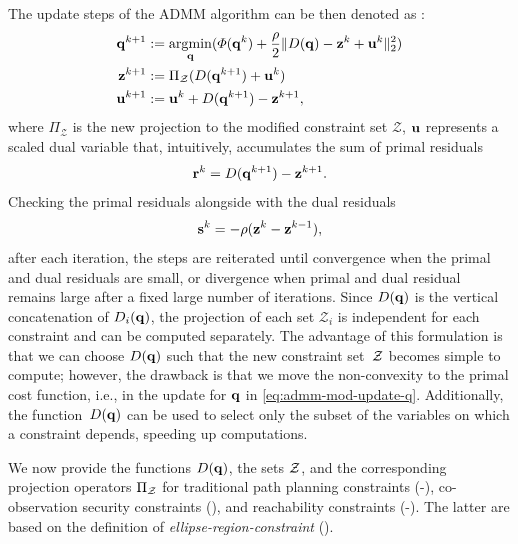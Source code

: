\documentclass[journal]{IEEEtran}  %
\begin{document}
The update steps of the ADMM algorithm can be then denoted as \cite{Boyd2011}:
\begin{subequations}\label{eq:ADMMupdate}
	\begin{align}
		\label{eq:admm-mod-update-q}\mathbf{q}^{k+1}&:=\operatorname*{\arg\!\min}_{\mathbf{q}}(\varPhi(\mathbf{q}^k) +\frac{\rho}{2}\lVert D(\mathbf{q})-\mathbf{z}^k+\mathbf{u}^k\rVert_2^2)\\
		\mathbf{z}^{k+1}&:=\Pi_\mathcal{Z}(D(\mathbf{q}^{k+1})+\mathbf{u}^k) \\
		\mathbf{u}^{k+1}&:=\mathbf{u}^k+D(\mathbf{q}^{k+1})-\mathbf{z}^{k+1},
	\end{align}
\end{subequations}
where $\Pi_\mathcal{Z}$ is the new projection to the modified constraint set $\mathcal{Z}$, $\mathbf{u}$ represents a scaled dual variable that, intuitively, accumulates the sum of primal residuals
\begin{equation}\label{eq:primal-residual}
	\mathbf{r}^{k}=D(\mathbf{q}^{k+1})-\mathbf{z}^{k+1}.
\end{equation}
Checking the primal residuals alongside with the dual residuals 
\begin{equation}\label{eq:dual-residual}
	\mathbf{s}^{k}=-\rho(\mathbf{z}^{k}-\mathbf{z}^{k-1}),
\end{equation}
after each iteration, the steps are reiterated until convergence when the primal and dual residuals are small, or divergence when primal and dual residual remains large after a fixed large number of iterations.
Since $D(\mathbf{q})$ is the vertical concatenation of $D_i(\mathbf{q})$, the projection of each set $\mathcal{Z}_i$ is independent for each constraint and can be computed separately. The advantage of this formulation is that we can choose $D(\mathbf{q})$ such that the new constraint set~$\mathcal{Z}$ becomes simple to compute; however, the drawback is that we move the non-convexity to the primal cost function, i.e., in the update for $\mathbf{q}$ in \eqref{eq:admm-mod-update-q}.
Additionally, the function~$D(\mathbf{q})$ can be used to select only the subset of the variables on which a constraint depends, speeding up computations.

We now provide the functions $D(\mathbf{q})$, the sets $\mathcal{Z}$, and the corresponding projection operators $\Pi_{\mathcal{Z}}$ for traditional path planning constraints (-), co-observation security constraints (), and reachability constraints (-). The latter are based on the definition of \emph{ellipse-region-constraint} ().
\end{document}
